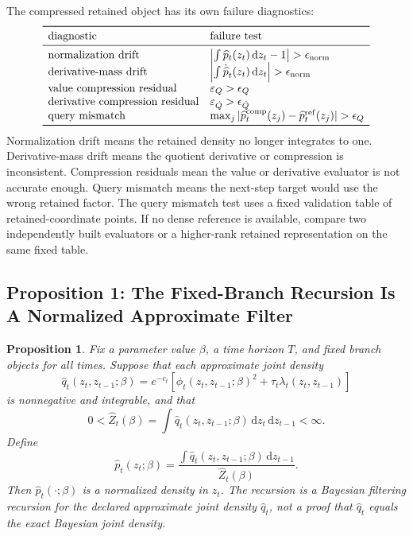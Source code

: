 \documentclass[11pt]{article}
\newtheorem{proposition}{Proposition}
\numberwithin{equation}{section}
\newcommand{\dd}{\,\mathrm d}
\begin{document}
The compressed retained object has its own failure diagnostics:
\begin{equation}
\begin{array}{ll}
\toprule
\text{diagnostic} & \text{failure test}\\
\midrule
\text{normalization drift} &
\left|\int \widehat p_t(z_t)\dd z_t-1\right|>\epsilon_{\rm norm}\\
\text{derivative-mass drift} &
\left|\int \dot{\widehat p}_t(z_t)\dd z_t\right|>\epsilon_{\rm norm}\\
\text{value compression residual} &
\varepsilon_Q>\epsilon_Q\\
\text{derivative compression residual} &
\varepsilon_{\dot Q}>\epsilon_{\dot Q}\\
\text{query mismatch} &
\max_j|\widehat p_t^{\rm comp}(z_j)-\widehat p_t^{\rm ref}(z_j)|>\epsilon_Q\\
\bottomrule
\end{array}
    \label{eq:p26-retained-storage-12}
\end{equation}
Normalization drift means the retained density no longer integrates to one.
Derivative-mass drift means the quotient derivative or compression is
inconsistent.  Compression residuals mean the value or derivative evaluator is
not accurate enough.  Query mismatch means the next-step target would use the
wrong retained factor.  The query mismatch test uses a fixed validation table
of retained-coordinate points.  If no dense reference is available, compare
two independently built evaluators or a higher-rank retained representation on
the same fixed table.

\subsection{Proposition 1: The Fixed-Branch Recursion Is A Normalized Approximate Filter}

\begin{proposition}
Fix a parameter value \(\beta\), a time horizon \(T\), and fixed branch objects
for all times.  Suppose that each approximate joint density
\begin{equation}
    \widehat q_t(z_t,z_{t-1};\beta)
    =
    e^{-c_t}\left[
    \phi_t(z_t,z_{t-1};\beta)^2
    +
    \tau_t\lambda_t(z_t,z_{t-1})
    \right]
    \label{eq:p24-p19-77}
\end{equation}
is nonnegative and integrable, and that
\begin{equation}
    0<\widehat Z_t(\beta)
    =
    \int \widehat q_t(z_t,z_{t-1};\beta)\dd z_t\dd z_{t-1}
    <\infty.
    \label{eq:p24-p19-78}
\end{equation}
Define
\begin{equation}
    \widehat p_t(z_t;\beta)
    =
    \frac{\int \widehat q_t(z_t,z_{t-1};\beta)\dd z_{t-1}}
    {\widehat Z_t(\beta)}.
    \label{eq:p24-p19-79}
\end{equation}
Then \(\widehat p_t(\cdot;\beta)\) is a normalized density in \(z_t\).  The
recursion is a Bayesian filtering recursion for the declared approximate joint
density \(\widehat q_t\), not a proof that \(\widehat q_t\) equals the exact
Bayesian joint density.
\end{proposition}
\end{document}
